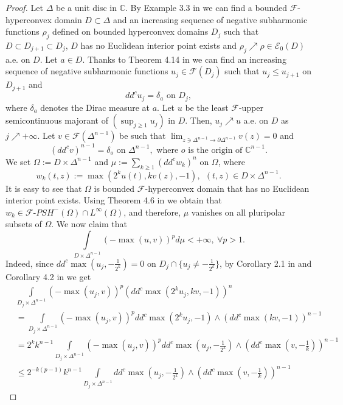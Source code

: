 \documentclass[3p,times]{elsarticle}
\numberwithin{equation}{section}
\newtheorem{The main theorem}[theorem]{The main theorem}
\theoremstyle{definition}
\begin{document}
\begin{proof}
Let $\Delta$ be a unit disc in $\mathbb C$. 
By Example 3.3 in \cite{TVH} we can find  a bounded  $\mathcal F$-hyperconvex domain  $D \subset \Delta$  and an increasing  sequence of negative   subharmonic functions  $ \rho_j $  defined on  bounded  hyperconvex domains $D_j$ such that  $D\subset D_{j+1} \subset D_j$, $D$ has no Euclidean interior point exists and   $\rho_j\nearrow \rho \in \mathcal E_0(D)$ a.e. on $D$. Let $a\in D$.
Thanks to Theorem 4.14 in \cite{ACCH} we can find an increasing sequence  of negative subharmonic functions $u_j \in \mathcal F(D_j)$ such that $u_j \leq u_{j+1}$ on $D_{j+1}$ and  
$$dd^c u_j  =\delta_a \text{ on } D_j, $$
where  $\delta_a$ denotes  the Dirac measure at $a$.
Let  $u$ be  the least $\mathcal F$-upper semicontinuous majorant  of $(\sup_{j\geq 1} u_j)$ in $D$. Then, $u_j\nearrow u$ a.e. on $D$ as $j\nearrow +\infty$. 
Let  $v \in \mathcal F(\Delta^{n-1})$ be such that $\lim_{z\ni \Delta^{n-1} \to \partial \Delta^{n-1}} v(z)=0$ and 
$$
(dd^c v)^{n-1} = \delta_{o} \text{ on } \Delta^{n-1}, \text{ where } o \text{ is the origin of } \mathbb C^{n-1}. 
$$
We set $\Omega:= D\times \Delta^{n-1}$ and
$\mu:= \sum_{k\geq 1} (dd^c w_k )^{n}$  on $\Omega $, where 
$$
w_k(t,z) :=  \max(2^k u(t), kv(z),-1)   , \ \ (t,z) \in D \times \Delta^{n-1}.
$$
It is easy to see that $\Omega$ is bounded $\mathcal F$-hyperconvex domain that has no Euclidean interior point exists.
Using Theorem 4.6 in \cite{KFW11} we obtain that 
$w_k \in \mathcal F \text{-} PSH^-(\Omega) \cap L^\infty (\Omega)$, and therefore,  $\mu$ vanishes on all pluripolar subsets of $ \Omega$.  
We now claim that 
$$
\int\limits_{D \times \Delta ^{n-1}} (- \max(u,v))^p d \mu <+\infty, \ \forall p>1.
$$
Indeed, since $dd^c  \max (  u_j  , - \frac{1}{2^{k}})=0$ on $D_j \cap  \{u_j  \neq - \frac{1}{2^{k}}\} $, by  Corollary 2.1 in \cite{ACH} and Corollary 4.2 in \cite{ACH} we get  
\begin{align*}
&\int\limits_{D_j  \times \Delta ^{n-1}} (- \max(u_j,v) )^p (dd^c \max(2^k u_j , kv,-1) )^{n} 
\\& = \int\limits_{D_j  \times \Delta ^{n-1}}(- \max(u_j,v) )^p dd^c  \max ( 2^{k} u_j  , -1)  \wedge (dd^c  \max ( k v  , -1) )^{n-1} 
\\& =  2^k k^{n-1}  \int\limits_{D_j  \times \Delta ^{n-1}} (- \max(u_j,v) )^p dd^c  \max (  u_j  , - \frac{1}{2^{k}})  \wedge (dd^c  \max (  v  , - \frac{1}{k}) )^{n-1}
\\& \leq  2^{-k(p-1)} k^{n-1}  \int\limits_{D_j  \times \Delta ^{n-1}} dd^c  \max (  u_j  , - \frac{1}{2^{k}})  \wedge (dd^c  \max (  v  , - \frac{1}{k}) )^{n-1} 

\end{align*}
\end{proof}
\end{document}
